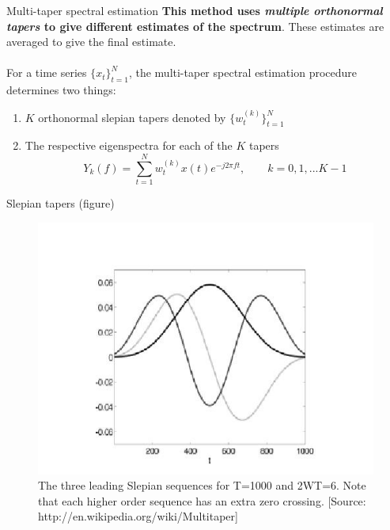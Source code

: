 \documentclass[mathserif]{beamer}
\begin{document}
\begin{frame}{Multi-taper spectral estimation}
\textbf{This method uses \emph{multiple orthonormal tapers} to give different estimates of the spectrum}. These estimates are averaged to give the final estimate. \\~\\


For a time series $\{x_t\}_{t=1}^N$, the multi-taper spectral estimation procedure determines two things:
\begin{enumerate}
    \item $K$ orthonormal slepian tapers denoted by $\{w_t^{(k)}\}_{t=1}^{N}$
    \item The respective eigenspectra for each of the $K$ tapers
\begin{equation*}
   Y_k(f) = \sum_{t=1}^N w_t^{(k)} x(t) e^{-j2\pi{}ft}, \qquad k = 0, 1, ...K-1
\end{equation*}
\end{enumerate}

\end{frame}




\begin{frame}{Slepian tapers (figure)}
\begin{figure}[p]
\centering
\includegraphics[height=0.65\textheight]{DPSS_figure.jpg}
\caption{The three leading Slepian sequences for T=1000 and 2WT=6. Note that each higher order sequence has an extra zero crossing. [Source: http://en.wikipedia.org/wiki/Multitaper]}
\end{figure}

\end{frame}
\end{document}
